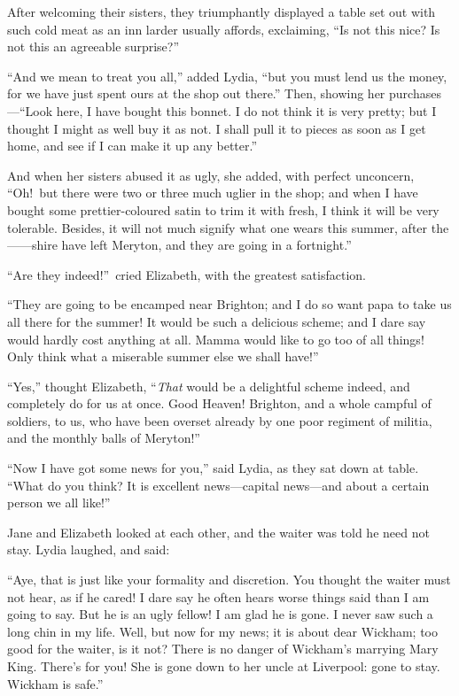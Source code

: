 \documentclass[12pt,english,oneside]{book}
\begin{document}
After welcoming their sisters, they triumphantly displayed a table
set out with such cold meat as an inn larder usually affords, exclaiming,
{}``Is not this nice? Is not this an agreeable surprise?''\ 

{}``And we mean to treat you all,'' added Lydia, {}``but you must
lend us the money, for we have just spent ours at the shop out there.''
Then, showing her purchases\mbox{---}{}``Look here, I have bought
this bonnet. I do not think it is very pretty; but I thought I might
as well buy it as not. I shall pull it to pieces as soon as I get
home, and see if I can make it up any better.''

And when her sisters abused it as ugly, she added, with perfect unconcern,
{}``Oh!\ but there were two or three much uglier in the shop; and
when I have bought some prettier-coloured satin to trim it with fresh,
I think it will be very tolerable. Besides, it will not much signify
what one wears this summer, after the \mbox{------}shire have left
Meryton, and they are going in a fortnight.''

{}``Are they indeed!''\ cried Elizabeth, with the greatest satisfaction.

{}``They are going to be encamped near Brighton; and I do so want
papa to take us all there for the summer! It would be such a delicious
scheme; and I dare say would hardly cost anything at all. Mamma would
like to go too of all things! Only think what a miserable summer else
we shall have!''\ 

{}``Yes,'' thought Elizabeth, {}``\textit{That} would be a delightful
scheme indeed, and completely do for us at once. Good Heaven! Brighton,
and a whole campful of soldiers, to us, who have been overset already
by one poor regiment of militia, and the monthly balls of Meryton!''\ 

{}``Now I have got some news for you,'' said Lydia, as they sat
down at table. {}``What do you think? It is excellent news\mbox{---}capital
news\mbox{---}and about a certain person we all like!''\ 

Jane and Elizabeth looked at each other, and the waiter was told he
need not stay. Lydia laughed, and said:

{}``Aye, that is just like your formality and discretion. You thought
the waiter must not hear, as if he cared! I dare say he often hears
worse things said than I am going to say. But he is an ugly fellow!
I am glad he is gone. I never saw such a long chin in my life. Well,
but now for my news; it is about dear Wickham; too good for the waiter,
is it not? There is no danger of Wickham's marrying Mary King. There's
for you! She is gone down to her uncle at Liverpool: gone to stay.
Wickham is safe.''
\end{document}
